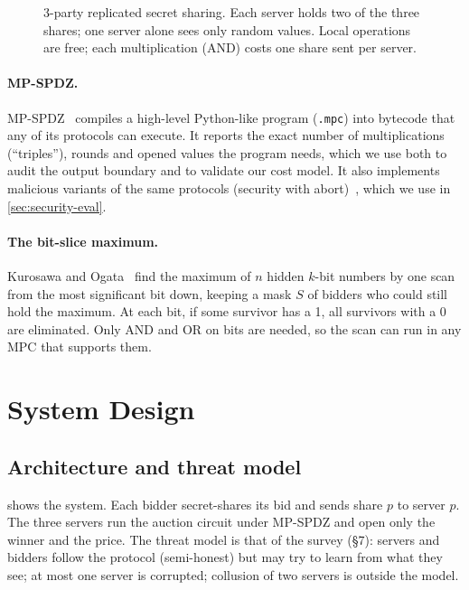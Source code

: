 \documentclass[11pt,a4paper]{article}
\newcommand{\code}[1]{\texttt{#1}}
\begin{document}
\begin{figure}[H]
  \centering
  \resizebox{0.86\linewidth}{!}{}
  \caption{3-party replicated secret sharing. Each server holds two of the three shares; one
           server alone sees only random values. Local operations are free; each multiplication
           (AND) costs one share sent per server.}
  \label{fig:replicated}
\end{figure}

\paragraph{MP-SPDZ.}
MP-SPDZ~\cite{mpspdz} compiles a high-level Python-like program (\code{.mpc}) into bytecode that
any of its protocols can execute. It reports the exact number of multiplications (``triples''),
rounds and opened values the program needs, which we use both to audit the output boundary and to
validate our cost model. It also implements malicious variants of the same protocols (security
with abort)~\cite{lindellnof17,furukawa17}, which we use in \cref{sec:security-eval}.

\paragraph{The bit-slice maximum.}
Kurosawa and Ogata~\cite{ko02} find the maximum of $n$ hidden $k$-bit numbers by one scan from the
most significant bit down, keeping a mask $S$ of bidders who could still hold the maximum. At each
bit, if some survivor has a 1, all survivors with a 0 are eliminated. Only AND and OR on bits are
needed, so the scan can run in any MPC that supports them.

\section{System Design}
\label{sec:design}

\subsection{Architecture and threat model}

 shows the system. Each bidder secret-shares its bid and sends share $p$
to server $p$. The three servers run the auction circuit under MP-SPDZ and open only the winner
and the price. The threat model is that of the survey (\S7): servers and bidders follow the
protocol (semi-honest) but may try to learn from what they see; at most one server is corrupted;
collusion of two servers is outside the model.
\end{document}
